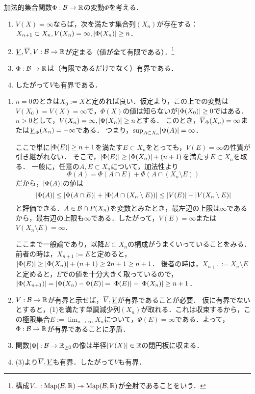 \documentclass[uplatex, dvipdfmx]{jsreport}
\begin{document}
\begin{lemma}[変動は有界である]
    加法的集合関数$\Phi:\mathcal{B}\to\mathbb{R}$の変動$\Phi$を考える．
    \begin{enumerate}
        \item $V(X)=\infty$ならば，次を満たす集合列$(X_n)$が存在する：$X_{n+1}\subset X_n,V(X_n)=\infty,\lvert\Phi(X_n)\rvert\ge n$．
        \item $\underline{V},\overline{V},V:\mathcal{B}\to\mathbb{R}$が定まる（値が全て有限である）．\footnote{構成$V_-:\mathrm{Map}(\mathcal{B},\mathbb{R})\twoheadrightarrow\mathrm{Map}(\mathcal{B},\mathbb{R})$が全射であることをいう．}
        \item $\Phi:\mathcal{B}\to\mathbb{R}$は（有限であるだけでなく）有界である．
        \item したがって$V$も有界である．
    \end{enumerate}
\end{lemma}
\begin{Proof}\mbox{}
    \begin{enumerate}
        \item $n=0$のときは$X_0:=X$と定めれば良い．仮定より，この上での変動は$V(X_0)=V(X)=\infty$で，$\Phi(X)$の値は知らないが$\lvert\Phi(X_0)\rvert\ge 0$ではある．
        $n>0$として，$V(X_n)=\infty,\lvert\Phi(X_n)\rvert\ge n$とする．
        このとき，$\overline{V}_\Phi(X_n)=\infty$または$\underline{V}_\Phi(X_n)=-\infty$である．
        つまり，$\sup_{A\subset X_n}\lvert\Phi(A)\rvert=\infty$．

        ここで単に$\lvert\Phi(E)\rvert\ge n+1$を満たす$E\subset X_n$をとっても，$V(E)=\infty$の性質が引き継がれない．
        そこで，$\lvert\Phi(E)\rvert\ge\lvert\Phi(X_n)\rvert+(n+1)$を満たす$E\subset X_n$を取る．
        一般に，任意の$A,E\subset X_n$について，加法性より
        \[\Phi(A)=\Phi(A\cap E)+\Phi(A\cap(X_n\setminus E))\]
        だから，$\lvert\Phi(A)\rvert$の値は
        \[\lvert\Phi(A)\rvert\le\lvert\Phi(A\cap E)\rvert+\lvert\Phi(A\cap(X_n\setminus E))\rvert\le\lvert V(E)\rvert+\lvert V(X_n\setminus E)\rvert\]
        と評価できる．$A\in\mathcal{B}\cap P(X_n)$を変数とみたとき，最左辺の上限は$\infty$であるから，最右辺の上限も$\infty$である．したがって，$V(E)=\infty$または$V(X_n\setminus E)=\infty$．
        
        ここまで一般論であり，以降$E\subset X_n$の構成がうまくいっていることをみる．
        前者の時は，$X_{n+1}:=E$と定めると，$\lvert\Phi(E)\rvert\ge\lvert\Phi(X_n)\rvert+(n+1)\ge 2n+1\ge n+1$．
        後者の時は，$X_{n+1}:=X_n\setminus E$と定めると，$E$での値を十分大きく取っているので，$\lvert\Phi(X_{n+1})\rvert=\lvert\Phi(X_n)-\Phi(E)\rvert=\lvert\Phi(E)\rvert-\lvert\Phi(X_n)\rvert\ge n+1$．
        \item $V:\mathcal{B}\to\mathbb{R}$が有界と示せば，$\overline{V},\underline{V}$が有界であることが必要．
        仮に有界でないとすると，(1)を満たす単調減少列$(X_n)$が取れる．これは収束するから，この極限集合$E:=\lim_{n\to\infty}X_n$について，$\Phi(E)=\infty$である．よって，$\Phi:\mathcal{B}\to\mathbb{R}$が有界であることに矛盾．
        \item 関数$\lvert\Phi\rvert:\mathcal{B}\to\mathbb{R}_{\ge 0}$の像は半径$\lvert V(X)\rvert\in\mathbb{R}$の閉円板に収まる．
        \item (3)より$\overline{V},\underline{V}$も有界．したがって$V$も有界．
    \end{enumerate}
\end{Proof}
\end{document}
